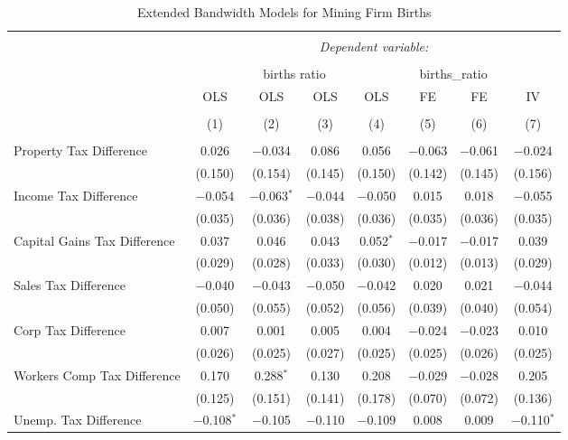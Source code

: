 
\begin{table}[!htbp] \centering 
  \caption{Extended Bandwidth Models for  Mining Firm Births} 
  \label{} 
\begin{tabular}{@{\extracolsep{5pt}}lccccccc} 
\\[-1.8ex]\hline 
\hline \\[-1.8ex] 
 & \multicolumn{7}{c}{\textit{Dependent variable:}} \\ 
\cline{2-8} 
\\[-1.8ex] & \multicolumn{4}{c}{births ratio} & \multicolumn{2}{c}{births\_ratio} &   \\ 
 & OLS & OLS & OLS & OLS & FE & FE & IV \\ 
\\[-1.8ex] & (1) & (2) & (3) & (4) & (5) & (6) & (7)\\ 
\hline \\[-1.8ex] 
 Property Tax Difference & 0.026 & $-$0.034 & 0.086 & 0.056 & $-$0.063 & $-$0.061 & $-$0.024 \\ 
  & (0.150) & (0.154) & (0.145) & (0.150) & (0.142) & (0.145) & (0.156) \\ 
  Income Tax Difference & $-$0.054 & $-$0.063$^{*}$ & $-$0.044 & $-$0.050 & 0.015 & 0.018 & $-$0.055 \\ 
  & (0.035) & (0.036) & (0.038) & (0.036) & (0.035) & (0.036) & (0.035) \\ 
  Capital Gains Tax Difference & 0.037 & 0.046 & 0.043 & 0.052$^{*}$ & $-$0.017 & $-$0.017 & 0.039 \\ 
  & (0.029) & (0.028) & (0.033) & (0.030) & (0.012) & (0.013) & (0.029) \\ 
  Sales Tax Difference & $-$0.040 & $-$0.043 & $-$0.050 & $-$0.042 & 0.020 & 0.021 & $-$0.044 \\ 
  & (0.050) & (0.055) & (0.052) & (0.056) & (0.039) & (0.040) & (0.054) \\ 
  Corp Tax Difference & 0.007 & 0.001 & 0.005 & 0.004 & $-$0.024 & $-$0.023 & 0.010 \\ 
  & (0.026) & (0.025) & (0.027) & (0.025) & (0.025) & (0.026) & (0.025) \\ 
  Workers Comp Tax Difference & 0.170 & 0.288$^{*}$ & 0.130 & 0.208 & $-$0.029 & $-$0.028 & 0.205 \\ 
  & (0.125) & (0.151) & (0.141) & (0.178) & (0.070) & (0.072) & (0.136) \\ 
  Unemp. Tax Difference & $-$0.108$^{*}$ & $-$0.105 & $-$0.110 & $-$0.109 & 0.008 & 0.009 & $-$0.110$^{*}$ \\ 

\end{tabular}
\end{table}
